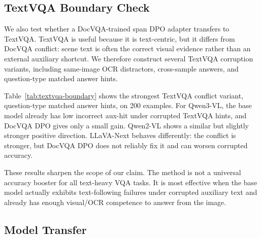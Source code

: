 \subsection{TextVQA Boundary Check}

We also test whether a DocVQA-trained span DPO adapter transfers to TextVQA.
TextVQA is useful because it is text-centric, but it differs from DocVQA conflict: scene text is often the correct visual evidence rather than an external auxiliary shortcut.
We therefore construct several TextVQA corruption variants, including same-image OCR distractors, cross-sample answers, and question-type matched answer hints.

Table~\ref{tab:textvqa-boundary} shows the strongest TextVQA conflict variant, question-type matched answer hints, on 200 examples.
For Qwen3-VL, the base model already has low incorrect aux-hit under corrupted TextVQA hints, and DocVQA DPO gives only a small gain.
Qwen2-VL shows a similar but slightly stronger positive direction.
LLaVA-Next behaves differently: the conflict is stronger, but DocVQA DPO does not reliably fix it and can worsen corrupted accuracy.

\begin{table}[t]
\centering
\caption{TextVQA question-type matched answer-hint transfer. DocVQA DPO transfers weakly to Qwen models but not reliably to LLaVA-Next.}
\label{tab:textvqa-boundary}
\end{table}

These results sharpen the scope of our claim.
The method is not a universal accuracy booster for all text-heavy VQA tasks.
It is most effective when the base model actually exhibits text-following failures under corrupted auxiliary text and already has enough visual/OCR competence to answer from the image.

\subsection{Model Transfer}

